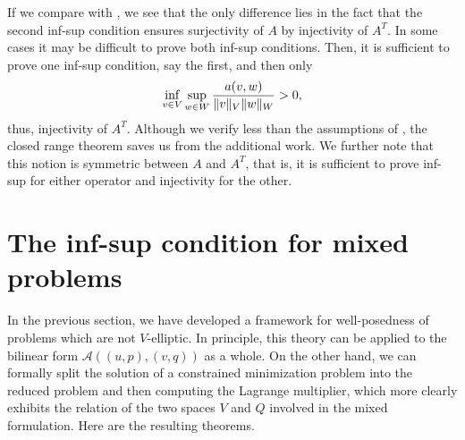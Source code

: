 \begin{remark}
  If we compare  with
  , we see that the only
  difference lies in the fact that the second inf-sup condition
  ensures surjectivity of $A$ by injectivity of $A^T$. In some cases
  it may be difficult to prove both inf-sup conditions. Then, it is
  sufficient to prove one inf-sup condition, say the first, and then
  only
  \begin{gather*}
     \inf_{v\in V}\sup_{w\in W}
    \frac{a(v,w)}{\lVert v\rVert_V\lVert w\rVert_W} > 0,
  \end{gather*}
  thus, injectivity of $A^T$. Although we verify less than the
  assumptions of , the
  closed range theorem saves us from the additional work. We further
  note that this notion is symmetric between $A$ and $A^T$, that is,
  it is sufficient to prove inf-sup for either operator and
  injectivity for the other.
\end{remark}

\section{The inf-sup condition for mixed problems}

\begin{intro}
  In the previous section, we have developed a framework for
  well-posedness of problems which are not $V$-elliptic. In principle,
  this theory can be applied to the bilinear form
  $\mathcal A((u,p),(v,q))$ as a whole. On the other hand, we can
  formally split the solution of a constrained minimization problem
  into the reduced problem and then computing the Lagrange multiplier,
  which more clearly exhibits the relation of the two spaces $V$ and
  $Q$ involved in the mixed formulation. Here are the resulting
  theorems.
\end{intro}

